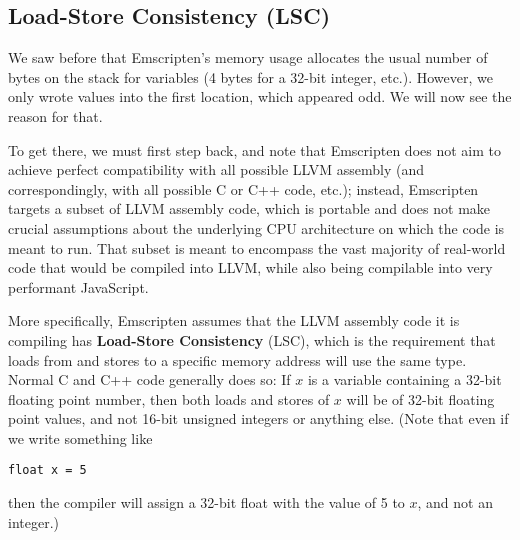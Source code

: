 \documentclass[11pt]{proc}
\begin{document}
\subsection{Load-Store Consistency (LSC)}

We saw before that Emscripten's memory usage allocates the usual number
of bytes on the stack for variables (4 bytes for a 32-bit integer, etc.).
However, we only wrote values into the first location, which appeared odd.
We will now see the reason for that.

To get there, we must first step back, and note that
Emscripten does not aim to achieve perfect compatibility with all possible
LLVM assembly (and correspondingly, with all possible C or C++ code, etc.);
instead, Emscripten targets a subset of LLVM assembly code, which is portable
and does not make crucial assumptions about the underlying CPU architecture
on which the code is meant to run. That subset is meant to encompass the
vast majority of real-world code that would be compiled into LLVM,
while also being compilable into very
performant JavaScript.

More specifically, Emscripten assumes that the LLVM assembly code it is
compiling has \textbf{Load-Store Consistency} (LSC), which is the requirement that
loads from and stores to a specific memory address will use the same type. Normal C and C++
code generally does so: If $x$ is a variable containing a 32-bit floating
point number, then both loads and stores of $x$ will be of 32-bit floating
point values, and not 16-bit unsigned integers or anything else. (Note that
even if we write something like \begin{verbatim}float x = 5\end{verbatim} then the
compiler will assign a 32-bit float with the value of 5 to $x$, and not
an integer.)
\end{document}
